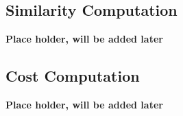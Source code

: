 \subsection{Similarity Computation}\label{sec:itemsimilarity}
\textbf{Place holder, will be added later}
\subsection{Cost Computation}\label{sec:adoptionlikelihood}
\textbf{Place holder, will be added later}
